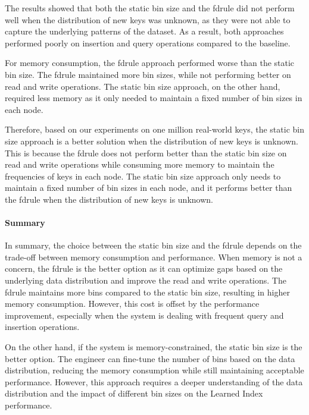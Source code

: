 \documentclass[11pt,a4paper]{article}
\newcommand{\learnindex}{\textsf{Learned Index}\xspace}
\begin{document}
The results showed that both the static bin size and the \acrshort{fdrule} did not perform well when the distribution of new keys was unknown, as they were not able to capture the underlying patterns of the dataset. As a result, both approaches performed poorly on insertion and query operations compared to the baseline.

For memory consumption, the \acrshort{fdrule} approach performed worse than the static bin size. The \acrshort{fdrule} maintained more bin sizes, while not performing better on read and write operations. The static bin size approach, on the other hand, required less memory as it only needed to maintain a fixed number of bin sizes in each node.

Therefore, based on our experiments on one million real-world keys, the static bin size approach is a better solution when the distribution of new keys is unknown. This is because the \acrshort{fdrule} does not perform better than the static bin size on read and write operations while consuming more memory to maintain the frequencies of keys in each node. The static bin size approach only needs to maintain a fixed number of bin sizes in each node, and it performs better than the \acrshort{fdrule} when the distribution of new keys is unknown.


\paragraph{Summary}

In summary, the choice between the static bin size and the \acrshort{fdrule} depends on the trade-off between memory consumption and performance. When memory is not a concern, the \acrshort{fdrule} is the better option as it can optimize gaps based on the underlying data distribution and improve the read and write operations. The \acrshort{fdrule} maintains more bins compared to the static bin size, resulting in higher memory consumption. However, this cost is offset by the performance improvement, especially when the system is dealing with frequent query and insertion operations.

On the other hand, if the system is memory-constrained, the static bin size is the better option. The engineer can fine-tune the number of bins based on the data distribution, reducing the memory consumption while still maintaining acceptable performance. However, this approach requires a deeper understanding of the data distribution and the impact of different bin sizes on the \learnindex performance.
\end{document}
